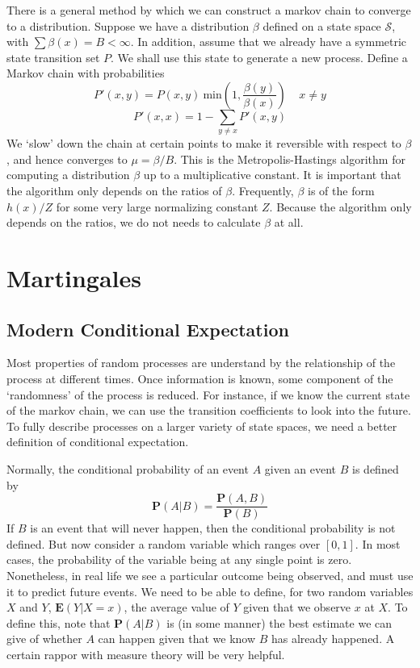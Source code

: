 There is a general method by which we can construct a markov chain to converge to a distribution. Suppose we have a distribution $\beta$ defined on a state space $\mathcal{S}$, with $\sum \beta(x) = B < \infty$. In addition, assume that we already have a symmetric state transition set $P$. We shall use this state to generate a new process. Define a Markov chain with probabilities
%
\[ P'(x,y) = P(x,y)\ \text{min}(1, \frac{\beta(y)}{\beta(x)})\ \ \ \ \ x \neq y \]
%
\[ P'(x,x) = 1 - \sum_{y \neq x} P'(x,y) \]
%
We `slow' down the chain at certain points to make it reversible with respect to $\beta$, and hence converges to $\mu = \beta/B$. This is the Metropolis-Hastings algorithm for computing a distribution $\beta$ up to a multiplicative constant. It is important that the algorithm only depends on the ratios of $\beta$. Frequently, $\beta$ is of the form $h(x)/Z$ for some very large normalizing constant $Z$. Because the algorithm only depends on the ratios, we do not needs to calculate $\beta$ at all.





\chapter{Martingales}

\section{Modern Conditional Expectation}

Most properties of random processes are understand by the relationship of the process at different times. Once information is known, some component of the `randomness' of the process is reduced. For instance, if we know the current state of the markov chain, we can use the transition coefficients to look into the future. To fully describe processes on a larger variety of state spaces, we need a better definition of conditional expectation.

Normally, the conditional probability of an event $A$ given an event $B$ is defined by
%
\[ \mathbf{P}(A | B) = \frac{\mathbf{P}(A,B)}{\mathbf{P}(B)} \]
%
If $B$ is an event that will never happen, then the conditional probability is not defined. But now consider a random variable which ranges over $[0,1]$. In most cases, the probability of the variable being at any single point is zero. Nonetheless, in real life we see a particular outcome being observed, and must use it to predict future events. We need to be able to define, for two random variables $X$ and $Y$, $\mathbf{E}(Y | X = x)$, the average value of $Y$ given that we observe $x$ at $X$. To define this, note that $\mathbf{P}(A | B)$ is (in some manner) the best estimate we can give of whether $A$ can happen given that we know $B$ has already happened. A certain rappor with measure theory will be very helpful.

